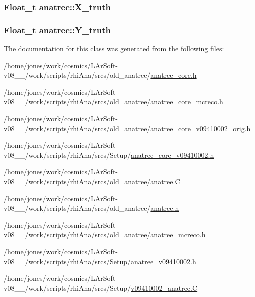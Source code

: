 \hypertarget{classanatree_af5f6b57a761380a82891afb9f1087992}{
\subsubsection[{X\-\_\-truth}]{\setlength{\rightskip}{0pt plus 5cm}Float\-\_\-t anatree\-::\-X\-\_\-truth}}\label{classanatree_af5f6b57a761380a82891afb9f1087992}
\hypertarget{classanatree_af7eb0221e94b46b77a90aedf51889a33}{
\subsubsection[{Y\-\_\-truth}]{\setlength{\rightskip}{0pt plus 5cm}Float\-\_\-t anatree\-::\-Y\-\_\-truth}}\label{classanatree_af7eb0221e94b46b77a90aedf51889a33}


The documentation for this class was generated from the following files\-:\begin{DoxyCompactItemize}
\item 
/home/jones/work/cosmics/\-L\-Ar\-Soft-\/v08\-\_\-\_/work/scripts/rhi\-Ana/srcs/old\-\_\-anatree/\hyperlink{anatree__core_8h}{anatree\-\_\-core.\-h}\item 
/home/jones/work/cosmics/\-L\-Ar\-Soft-\/v08\-\_\-\_/work/scripts/rhi\-Ana/srcs/old\-\_\-anatree/\hyperlink{anatree__core__mcreco_8h}{anatree\-\_\-core\-\_\-mcreco.\-h}\item 
/home/jones/work/cosmics/\-L\-Ar\-Soft-\/v08\-\_\-\_/work/scripts/rhi\-Ana/srcs/old\-\_\-anatree/\hyperlink{anatree__core__v09410002__orig_8h}{anatree\-\_\-core\-\_\-v09410002\-\_\-orig.\-h}\item 
/home/jones/work/cosmics/\-L\-Ar\-Soft-\/v08\-\_\-\_/work/scripts/rhi\-Ana/srcs/\-Setup/\hyperlink{anatree__core__v09410002_8h}{anatree\-\_\-core\-\_\-v09410002.\-h}\item 
/home/jones/work/cosmics/\-L\-Ar\-Soft-\/v08\-\_\-\_/work/scripts/rhi\-Ana/srcs/old\-\_\-anatree/\hyperlink{anatree_8C}{anatree.\-C}\item 
/home/jones/work/cosmics/\-L\-Ar\-Soft-\/v08\-\_\-\_/work/scripts/rhi\-Ana/srcs/old\-\_\-anatree/\hyperlink{anatree_8h}{anatree.\-h}\item 
/home/jones/work/cosmics/\-L\-Ar\-Soft-\/v08\-\_\-\_/work/scripts/rhi\-Ana/srcs/old\-\_\-anatree/\hyperlink{anatree__mcreco_8h}{anatree\-\_\-mcreco.\-h}\item 
/home/jones/work/cosmics/\-L\-Ar\-Soft-\/v08\-\_\-\_/work/scripts/rhi\-Ana/srcs/\-Setup/\hyperlink{anatree__v09410002_8h}{anatree\-\_\-v09410002.\-h}\item 
/home/jones/work/cosmics/\-L\-Ar\-Soft-\/v08\-\_\-\_/work/scripts/rhi\-Ana/srcs/\-Setup/\hyperlink{v09410002__anatree_8C}{v09410002\-\_\-anatree.\-C}\end{DoxyCompactItemize}
